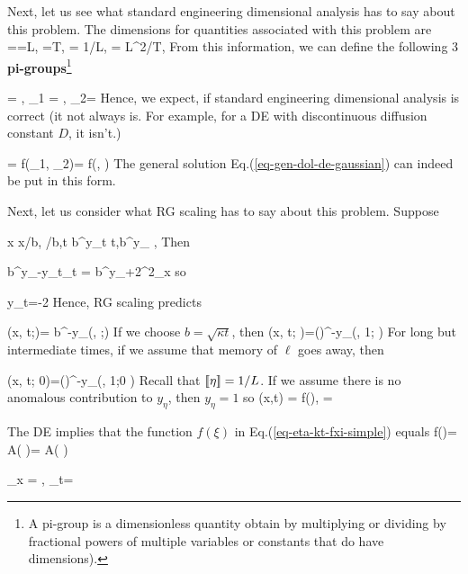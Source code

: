 Next, let us see what standard engineering dimensional
analysis has to say about this problem. The dimensions
for quantities associated with this problem are
\beq
{}=\engdim{\ell}=L, \quad 
{}=T, \quad 
\engdim{\eta}= 1/L,\quad 
\engdim{\kappa }= L^2/T,\quad 
\eeq
From this information,
we can define the following 3 {\bf pi-groups}\footnote{
A pi-group is a
dimensionless quantity obtain by multiplying 
or dividing by fractional powers of multiple variables or constants
that do have dimensions).}

\beq
\Pi =\eta {} ,\quad
\Pi_1 = ,\quad
\Pi_2= 
\eeq
Hence, we expect, if standard  engineering dimensional
analysis is correct (it not  always is. For example,
for a DE with discontinuous diffusion constant $D$, it isn't.)

\beq
\Pi = f(\Pi_1, \Pi_2)\implies \eta = f\left(, \right)
\eeq
The general solution Eq.(\ref{eq-gen-dol-de-gaussian})
can indeed be put in this form.

Next, let us consider what RG scaling has to say about this problem. Suppose

\beq
x \to x/b, \quad \ell\rarrow \ell/b,\quad t \to b^{y_t} t,\quad \eta \to b^{y_\eta} \eta,
\eeq
Then

\beq
b^{y_\eta -y_t}\partial_t \eta =
b^{y_\eta+2}\partial^2_x\eta
\eeq
so

\beq
y_t=-2
\eeq
Hence, RG scaling predicts

\beq
\eta(x, t;\ell)= b^{-y_\eta}\eta\left(, ;\right)
\eeq
If we choose  $b=\sqrt{\kappa t}$, then
\beq
\eta(x, t; \ell)=()^{-y_\eta}\eta\left(, 1;
\right)
\eeq
For long but intermediate times, if we assume that memory of 
$\ell$ goes away, then

\beq
\eta(x, t; 0)=()^{-y_\eta}\eta\left(, 1;0
\right)
\eeq
Recall that $[\![ \eta ]\!]=1/L$. If we assume there
is no anomalous  contribution to $y_\eta$, then $y_\eta=1$ so
\beq
\eta(x,t)
=
f(\xi), \quad{}\xi = 
\label{eq-eta-kt-fxi-simple}
\eeq


\begin{claim}
The DE implies that the function $f(\xi)$ 
in Eq.(\ref{eq-eta-kt-fxi-simple}) equals
\beq
f(\xi)= A\exp\left(
\right)= A\exp\left(
\right)
\eeq
\end{claim}
\proof
\beq
\partial_x \xi= ,\quad 
{}\partial_t\xi =
\eeq

